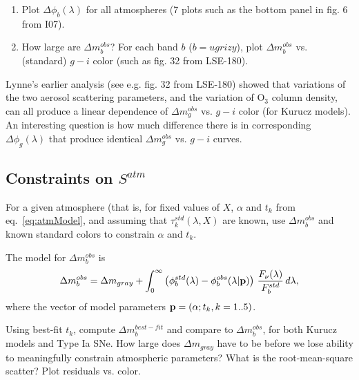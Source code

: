 \documentclass[12pt,preprint]{aastex}
\begin{document}
\begin{enumerate} 
\item Plot $\Delta \phi_b(\lambda)$ for all atmospheres (7 plots such as the
bottom panel in fig. 6 from I07). 
\item
How large are $\Delta m_b^{obs}$? 
For each band $b$ ($b=ugrizy$), plot $\Delta m_b^{obs}$ vs. (standard) $g-i$ color
(such as fig. 32 from LSE-180). 
\end{enumerate} 

Lynne's earlier analysis (see e.g. fig. 32 from LSE-180) showed that variations of the 
two aerosol scattering parameters, and the variation of O$_3$ column density, can all 
produce a linear dependence of $\Delta m_g^{obs}$ vs. $g-i$ color (for Kurucz models). 
An interesting question is how much difference there is in corresponding $\Delta \phi_g(\lambda)$
that produce identical $\Delta m_g^{obs}$ vs. $g-i$ curves. 

\subsection{Constraints on $S^{atm}$} 

For a given atmosphere (that is, for fixed values of $X$, $\alpha$ and $t_k$ from eq.~\ref{eq:atmModel}, 
and assuming that $\tau_k^{std}(\lambda, X)$ are known, use $\Delta m_b^{obs}$ and known standard 
colors to constrain $\alpha$ and $t_k$.  

The model for $\Delta m_b^{obs}$ is 
\begin{equation}
  \Delta m_b^{obs}  = \Delta m_{gray} + \int_0^\infty { \left( \phi_b^{std}(\lambda) - \phi_b^{obs}(\lambda|{\bf p}) \right) \,  {F_\nu(\lambda) \over F_b^{std}} \, d\lambda},
\end{equation}
where the vector of model parameters ${\bf p} = (\alpha; t_k, k=1..5)$. 

Using best-fit $t_k$, compute $\Delta m_b^{best-fit}$ and compare to 
$\Delta m_b^{obs}$, for both Kurucz models and Type Ia SNe. How large does $\Delta m_{gray}$
have to be before we lose ability to meaningfully constrain atmospheric parameters? 
What is the root-mean-square scatter? Plot residuals vs. color. 
\end{document}

